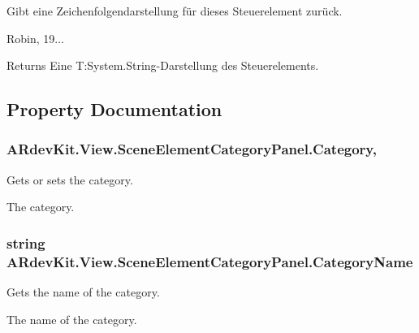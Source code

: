 Gibt eine Zeichenfolgendarstellung für dieses Steuerelement zurück. 

Robin, 19... 

\begin{DoxyReturn}{Returns}
Eine T\-:\-System.\-String-\/\-Darstellung des Steuerelements. 
\end{DoxyReturn}


\subsection{Property Documentation}
\hypertarget{class_a_rdev_kit_1_1_view_1_1_scene_element_category_panel_aced9eb9454bc80f538ba8e5b1f055bbe}{
\subsubsection[{Category}]{ A\-Rdev\-Kit.\-View.\-Scene\-Element\-Category\-Panel.\-Category\hspace{0.3cm}{\ttfamily [get]}, {\ttfamily [set]}}}\label{class_a_rdev_kit_1_1_view_1_1_scene_element_category_panel_aced9eb9454bc80f538ba8e5b1f055bbe}


Gets or sets the category. 

The category. \hypertarget{class_a_rdev_kit_1_1_view_1_1_scene_element_category_panel_abfbcb63fcffe07fbd16582c5cde37c36}{
\subsubsection[{Category\-Name}]{\setlength{\rightskip}{0pt plus 5cm}string A\-Rdev\-Kit.\-View.\-Scene\-Element\-Category\-Panel.\-Category\-Name\hspace{0.3cm}{\ttfamily [get]}}}\label{class_a_rdev_kit_1_1_view_1_1_scene_element_category_panel_abfbcb63fcffe07fbd16582c5cde37c36}


Gets the name of the category. 

The name of the category. 